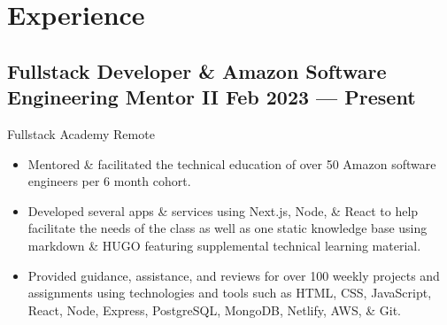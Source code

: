 \documentclass[a4,10pt]{article}
\newcommand{\subtext}[1]{
#1\par\vspace{-0.2cm}}
\newenvironment{zitemize}{
\begin{itemize}\itemsep0pt \parskip0pt \parsep1pt}
{\end{itemize}\vspace{-0.5cm}}
\begin{document}
\section{Experience}

\subsection*{Fullstack Developer \& Amazon Software Engineering Mentor II {\normalsize \normalfont} \hfill  Feb 2023 --- Present }
\subtext{Fullstack Academy \hfill Remote }
    \begin{zitemize}
        \item Mentored \& facilitated the technical education of over 50 Amazon software engineers per 6 month cohort.
        \item Developed several apps \& services using Next.js, Node, \& React to help facilitate the needs of the class as well as one static knowledge base using markdown \& HUGO featuring supplemental technical learning material.
        \item Provided guidance, assistance, and reviews for over 100 weekly projects and assignments using technologies and tools such as HTML, CSS, JavaScript, React, Node, Express, PostgreSQL, MongoDB, Netlify, AWS, \& Git.
    \end{zitemize}

\end{document}
